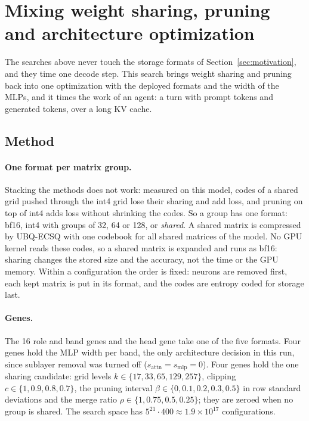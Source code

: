 \documentclass[11pt]{article}
\begin{document}
\section{Mixing weight sharing, pruning and architecture optimization}
\label{sec:mix}

The searches above never touch the storage formats of Section~\ref{sec:motivation}, and they time one
decode step. This search brings weight sharing and pruning back into one optimization with the deployed
formats and the width of the MLPs, and it times the work of an agent: a turn with prompt tokens and
generated tokens, over a long KV cache.

\subsection{Method}
\paragraph{One format per matrix group.}
Stacking the methods does not work: measured on this model, codes of a shared grid pushed through the
int4 grid lose their sharing and add loss, and pruning on top of int4 adds loss without shrinking the
codes. So a group has one format: bf16, int4 with groups of 32, 64 or 128, or \emph{shared}. A shared
matrix is compressed by UBQ-ECSQ with one codebook for all shared matrices of the model. No GPU kernel
reads these codes, so a shared matrix is expanded and runs as bf16: sharing changes the stored size and the
accuracy, not the time or the GPU memory. Within a configuration the order is fixed: neurons are removed
first, each kept matrix is put in its format, and the codes are entropy coded for storage last.

\paragraph{Genes.}
The 16 role and band genes and the head gene take one of the five formats. Four genes hold the MLP width
per band, the only architecture decision in this run, since sublayer removal was turned off
($s_{\text{attn}}=s_{\text{mlp}}=0$). Four genes hold the one sharing candidate: grid levels
$k\in\{17,33,65,129,257\}$, clipping $c\in\{1,0.9,0.8,0.7\}$, the pruning interval
$\beta\in\{0,0.1,0.2,0.3,0.5\}$ in row standard deviations and the merge ratio
$\rho\in\{1,0.75,0.5,0.25\}$; they are zeroed when no group is shared. The search space has
$5^{21}\cdot400\approx1.9\times10^{17}$ configurations.
\end{document}

